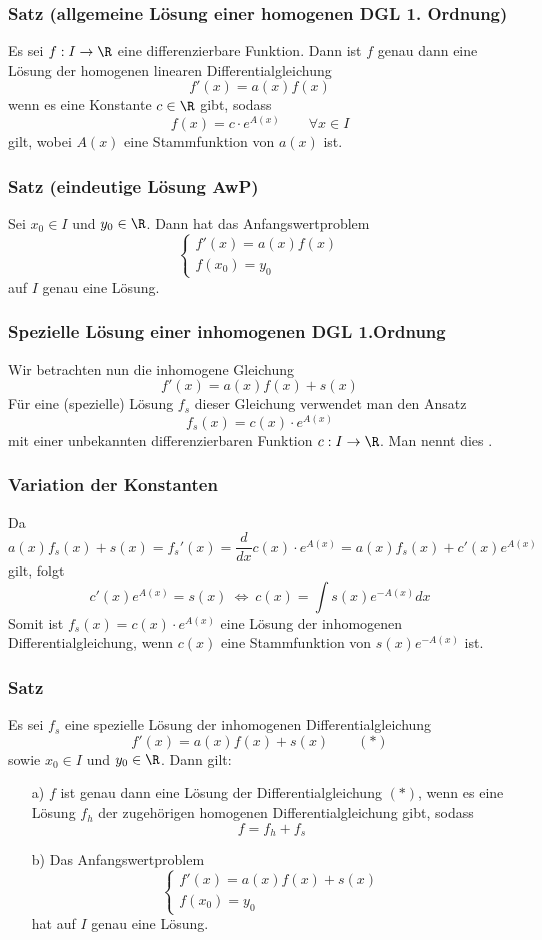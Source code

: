 %
\begin{frame}\frametitle{Satz (allgemeine Lösung einer homogenen DGL 1. Ordnung)}
Es sei $f:I \to \R$ eine differenzierbare Funktion. Dann ist $f$ genau dann eine Lösung der homogenen linearen Differentialgleichung
$$
f'(x)=a(x)f(x)
$$
wenn es eine Konstante $c \in \R$ gibt, sodass 
$$
f(x)=c\cdot e^{A(x)} \qquad \forall x \in I
$$
gilt, wobei $A(x)$ eine Stammfunktion von $a(x)$ ist.
\end{frame}
%
%
\begin{frame}\frametitle{Satz (eindeutige Lösung AwP)}
Sei $x_0 \in I$ und $y_0 \in \R$. Dann hat das Anfangswertproblem
$$
\begin{cases} f'(x)=a(x)f(x)\\
f(x_0)=y_0
\end{cases}
$$
auf $I$ genau eine Lösung.
\end{frame}
%
%
\begin{frame}\frametitle{Spezielle Lösung einer inhomogenen DGL 1.Ordnung}
Wir betrachten nun die inhomogene Gleichung
$$
f'(x)=a(x)f(x)+s(x)
$$
Für eine (spezielle) Lösung $f_s$ dieser Gleichung verwendet man den Ansatz
$$
f_s(x)=c(x)\cdot e^{A(x)}
$$
mit einer unbekannten differenzierbaren Funktion $c:I \to \R$. Man nennt dies .

\end{frame}
%
%
\begin{frame}\frametitle{Variation der Konstanten}
Da 
$$
a(x)f_s(x)+s(x)=f_s'(x)=\frac{d}{dx}c(x)\cdot e^{A(x)}=a(x)f_s(x)+c'(x)e^{A(x)}
$$
gilt, \pause folgt
$$
c'(x)e^{A(x)}=s(x)\ \Longleftrightarrow\ c(x)=\int s(x)e^{-A(x)}dx
$$
Somit ist $f_s(x)=c(x)\cdot e^{A(x)}$ eine Lösung der inhomogenen Differentialgleichung, wenn  $c(x)$ eine Stammfunktion von $s(x)e^{-A(x)}$ ist.
\end{frame}
%
%
\begin{frame}\frametitle{Satz}
Es sei $f_s$ eine spezielle Lösung der inhomogenen Differentialgleichung
$$
f'(x)=a(x)f(x)+s(x) \qquad (*)
$$
sowie $x_0\in I$ und $y_0 \in \R$. Dann gilt:
\begin{itemize}
\item[a)] $f$ ist genau dann eine Lösung der Differentialgleichung $(*)$, wenn es eine Lösung $f_h$ der zugehörigen homogenen Differentialgleichung gibt, sodass
$$
f=f_h+f_s
$$
\item[b)] Das Anfangswertproblem
$$
\begin{cases}
f'(x)=a(x)f(x)+s(x)\\
f(x_0)=y_0
\end{cases}
$$
hat auf $I$ genau eine Lösung.
\end{itemize}

\end{frame}
%
